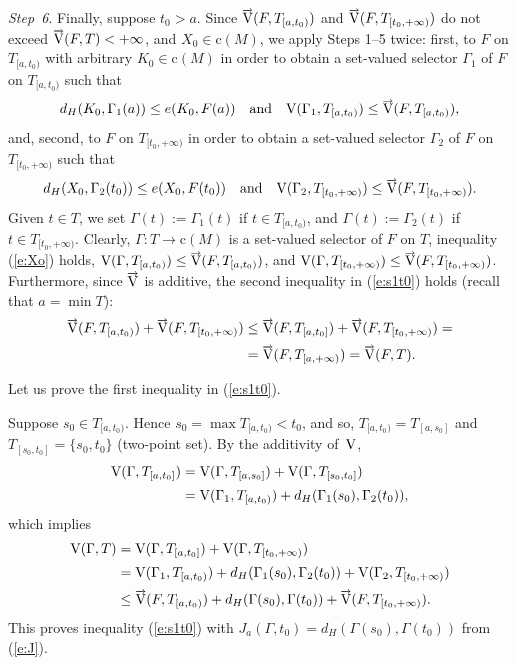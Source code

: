 \documentclass[preprint,12pt]{elsarticle}
\newcommand{\eq}[1]{\mbox{\rm(\ref{#1})}}
\newcommand{\nV}{\mbox{\rm V}}
\newcommand{\riV}{{\scriptstyle\overrightarrow{\mbox{\rm V}}}}
\begin{document}
\begin{pfBV}
{\it Step~6}. Finally, suppose $t_0>a$. Since $\riV(F,T_{[a,t_0)})$ and
$\riV(F,T_{[t_0,+\infty)})$ do not exceed $\riV(F,T)<+\infty$, and $X_0\in\mbox{c}(M)$,
we apply Steps 1--5 twice: first, to $F$ on $T_{[a,t_0)}$ with arbitrary
$K_0\in\mbox{c}(M)$ in order to obtain a set-valued selector $\Gamma_1$ of $F$
on $T_{[a,t_0)}$ such that
  \begin{equation*}
d_H(K_0,\Gamma_1(a))\le e(K_0,F(a))\quad\mbox{and}\quad
  \nV(\Gamma_1,T_{[a,t_0)})\le\riV(F,T_{[a,t_0)}),
  \end{equation*}
and, second, to $F$ on $T_{[t_0,+\infty)}$ in order to obtain a set-valued selector
$\Gamma_2$ of $F$ on $T_{[t_0,+\infty)}$ such that
  \begin{equation*}
d_H(X_0,\Gamma_2(t_0))\le e(X_0,F(t_0))\quad\mbox{and}\quad
  \nV(\Gamma_2,T_{[t_0,+\infty)})\le\riV(F,T_{[t_0,+\infty)}).
  \end{equation*}
Given $t\in T$, we set $\Gamma(t):=\Gamma_1(t)$ if $t\in T_{[a,t_0)}$, and
$\Gamma(t):=\Gamma_2(t)$ if $t\in T_{[t_0,+\infty)}$.
\linebreak
Clearly, $\Gamma:T\to\mbox{c}(M)$ is a set-valued selector of $F$ on $T$, inequality
\eq{e:Xo} holds, $\nV(\Gamma,T_{[a,t_0)})\le\riV(F,T_{[a,t_0)})$, and
$\nV(\Gamma,T_{[t_0,+\infty)})\le\riV(F,T_{[t_0,+\infty)})$. Furthermore,
since $\riV$ is additive, the second inequality in \eq{e:s1t0} holds (recall that $a=\min T$):
  \begin{align*}
\riV(F,T_{[a,t_0)})+\riV(F,T_{[t_0,+\infty)})&\le
  \riV(F,T_{[a,t_0]})+\riV(F,T_{[t_0,+\infty)})=\\[2pt]
&=\riV(F,T_{[a,+\infty)})=\riV(F,T).
  \end{align*}

Let us prove the first inequality in \eq{e:s1t0}.

Suppose $s_0\in T_{[a,t_0)}$. Hence $s_0=\max T_{[a,t_0)}<t_0$, and so,
$T_{[a,t_0)}=T_{[a,s_0]}$ and $T_{[s_0,t_0]}=\{s_0,t_0\}$ (two-point set).
By the additivity of~$\nV$,
  \begin{align*}
\nV(\Gamma,T_{[a,t_0]})&=\nV(\Gamma,T_{[a,s_0]})+\nV(\Gamma,T_{[s_0,t_0]})
  \\[2pt]
&=\nV(\Gamma_1,T_{[a,t_0)})+d_H(\Gamma_1(s_0),\Gamma_2(t_0)),
  \end{align*}
which implies
  \begin{align*}
\nV(\Gamma,T)&=\nV(\Gamma,T_{[a,t_0]})+\nV(\Gamma,T_{[t_0,+\infty)})\\[2pt]
&=\nV(\Gamma_1,T_{[a,t_0)})+d_H(\Gamma_1(s_0),\Gamma_2(t_0))
  +\nV(\Gamma_2,T_{[t_0,+\infty)})\\[2pt]
&\le\riV(F,T_{[a,t_0)})+d_H(\Gamma(s_0),\Gamma(t_0))+\riV(F,T_{[t_0,+\infty)}).
  \end{align*}
This proves inequality \eq{e:s1t0} with 
$J_a(\Gamma,t_0)=d_H(\Gamma(s_0),\Gamma(t_0))$ from \eq{e:J}.


\end{pfBV}
\end{document}

